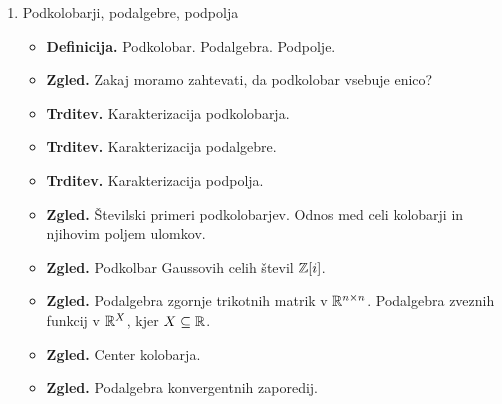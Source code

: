 \begin{enumerate}
    \item Podkolobarji, podalgebre, podpolja
    \begin{itemize}
        \item \textbf{Definicija.} Podkolobar. Podalgebra. Podpolje.
        \item \textbf{Zgled.} Zakaj moramo zahtevati, da podkolobar vsebuje enico?
        \item \textbf{Trditev.} Karakterizacija podkolobarja.
        \item \textbf{Trditev.} Karakterizacija podalgebre.
        \item \textbf{Trditev.} Karakterizacija podpolja.
        \item \textbf{Zgled.} Številski primeri podkolobarjev. Odnos med celi kolobarji in njihovim poljem ulomkov.
        \item \textbf{Zgled.} Podkolbar Gaussovih celih števil \(\mathbb{Z}[i]\).
        \item \textbf{Zgled.} Podalgebra zgornje trikotnih matrik v \(\mathbb{R}^{n \times n}\). Podalgebra zveznih funkcij v \(\mathbb{R}^X\), kjer \(X \subseteq \mathbb{R}\).
        \item \textbf{Zgled.} Center kolobarja.
        \item \textbf{Zgled.} Podalgebra konvergentnih zaporedij.
    \end{itemize}


\end{enumerate}
